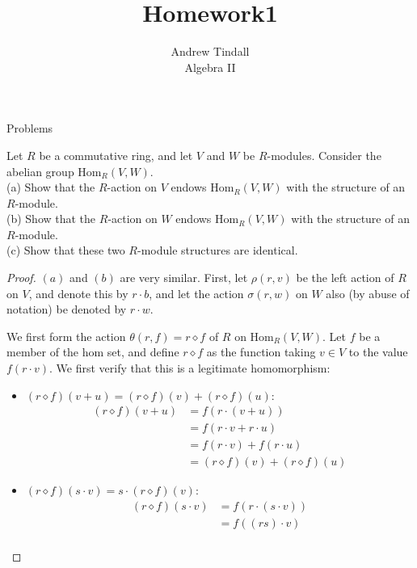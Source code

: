 \documentclass[12pt]{article}
\theoremstyle{definition}
\newenvironment{problem}[2][Problem]{\begin{trivlist}
\item[\hskip \labelsep {\bfseries #1}\hskip \labelsep {\bfseries #2.}]}{\end{trivlist}}
\begin{document}
 
 
\title{Homework1}
\author{Andrew Tindall\\
Algebra II}
 
\maketitle
\begin{section}{Problems}

	\begin{problem}{1}
		Let $R$ be a commutative ring, and let $V$ and $W$ be $R$-modules. Consider the abelian group $\text{Hom}_R(V,W)$. \\
		(a) Show that the $R$-action on $V$ endows $\text{Hom}_R(V,W)$ with the structure of an $R$-module.\\
		(b) Show that the $R$-action on $W$ endows $\text{Hom}_R(V,W)$ with the structure of an $R$-module.\\
		(c) Show that these two $R$-module structures are identical.
	\end{problem}
	\begin{proof}
		$(a)$ and $(b)$ are very similar. First, let $\rho(r,v)$ be the left action of $R$ on $V$, and denote this by $r \cdot b$, and let the action $\sigma(r, w)$ on $W$ also (by abuse of notation) be denoted by $r \cdot w$.
		\par  We first form the action $\theta(r, f) = r \diamond f$ of $R$ on $\text{Hom}_R(V,W)$. Let $f$ be a member of the hom set, and define $r \diamond f$ as the function taking $v \in V$ to the value $f(r \cdot v)$. We first verify that this is a legitimate homomorphism:
		\begin{itemize}
			\item $(r \diamond f)(v + u) = (r \diamond f)(v) + (r \diamond f)(u)$:
				\begin{align*}
					(r \diamond f)(v + u) &= f(r \cdot (v + u))\\
					&= f(r \cdot v + r \cdot u)\\
					&= f(r \cdot v) + f(r \cdot u)\\
					&= (r \diamond f)(v) + (r \diamond f)(u)
				\end{align*}
			\item $(r \diamond f)(s \cdot v) = s \cdot (r \diamond f)(v)$:
				\begin{align*}
					(r \diamond f)(s \cdot v) &= f(r \cdot (s \cdot v))\\
					&= f( (rs) \cdot v)\\

\end{align*}
\end{itemize}
\end{proof}
\end{section}
\end{document}
